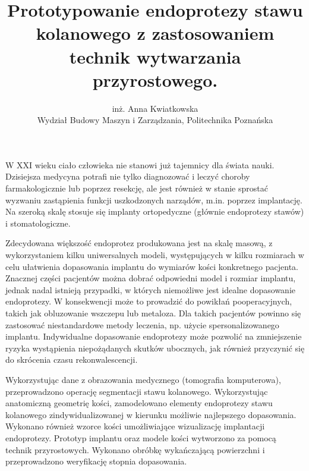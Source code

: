 \documentclass[12pt, a4paper]{article}
\begin{document}
\title{Prototypowanie endoprotezy stawu kolanowego z zastosowaniem technik wytwarzania przyrostowego.}
\author{inż. Anna Kwiatkowska \\ Wydział Budowy Maszyn i Zarządzania, Politechnika Poznańska}
\date {}
\maketitle
\thispagestyle{title}
W XXI wieku ciało człowieka nie stanowi już tajemnicy dla świata nauki. Dzisiejsza medycyna potrafi nie tylko diagnozować i leczyć choroby farmakologicznie lub poprzez resekcję, ale jest również w stanie sprostać wyzwaniu zastąpienia funkcji uszkodzonych narządów, m.in. poprzez implantację. Na szeroką skalę stosuje się implanty ortopedyczne (głównie endoprotezy stawów) i stomatologiczne.

Zdecydowana większość endoprotez produkowana jest na skalę masową, z wykorzystaniem kilku uniwersalnych modeli, występujących w kilku rozmiarach w celu ułatwienia dopasowania implantu do wymiarów kości konkretnego pacjenta. Znacznej części pacjentów można dobrać odpowiedni model i rozmiar implantu, jednak nadal istnieją przypadki, w których niemożliwe jest idealne dopasowanie endoprotezy. W konsekwencji może to prowadzić do powikłań pooperacyjnych, takich jak obluzowanie wszczepu lub metaloza. Dla takich pacjentów powinno się zastosować niestandardowe metody leczenia, np. użycie spersonalizowanego implantu. Indywidualne dopasowanie endoprotezy może pozwolić na zmniejszenie ryzyka wystąpienia niepożądanych skutków ubocznych, jak również przyczynić się do skrócenia czasu rekonwalescencji.

Wykorzystując dane z obrazowania medycznego (tomografia komputerowa), przeprowadzono operację segmentacji stawu kolanowego. Wykorzystując anatomiczną geometrię kości, zamodelowano elementy endoprotezy stawu kolanowego zindywidualizowanej w kierunku możliwie najlepszego dopasowania. Wykonano również wzorce kości umożliwiające wizualizację implantacji endoprotezy. Prototyp implantu oraz modele kości wytworzono za pomocą technik przyrostowych. Wykonano obróbkę wykańczającą powierzchni i przeprowadzono weryfikację stopnia dopasowania.
\end{document}
